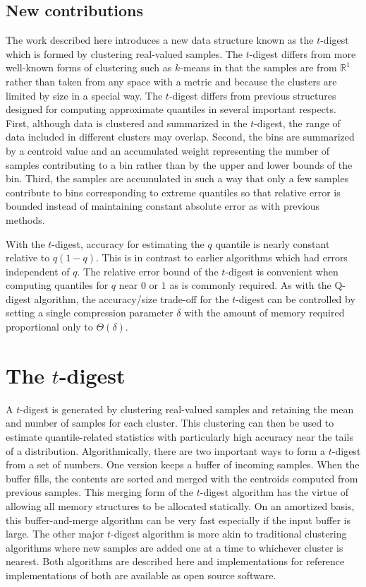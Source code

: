 \documentclass[]{statsoc}
\begin{document}
\subsection{New contributions}
The work described here introduces a new data structure known as the $t$-digest which is formed by clustering real-valued samples. The $t$-digest differs from more well-known forms of clustering such as $k$-means in that the samples are from $\mathbb R^1$ rather than taken from any space with a metric and because the clusters are limited by size in a special way. The $t$-digest differs from previous structures designed for computing approximate quantiles in several important respects. First, although data is clustered and summarized in the $t$-digest, the range of data included in different clusters may overlap. Second, the bins are summarized by a centroid value and an accumulated weight representing the number of samples contributing to a bin rather than by the upper and lower bounds of the bin. Third, the samples are accumulated in such a way that only a few samples contribute to bins corresponding to extreme quantiles so that relative error is bounded instead of maintaining constant absolute error as with previous methods.

With the $t$-digest, accuracy for estimating the $q$ quantile is nearly constant relative to $q(1-q)$.  This is in contrast to earlier algorithms which had errors independent of $q$.  The relative error bound of the $t$-digest is convenient when computing quantiles for $q$ near $0$ or $1$ as is commonly required.  As with the Q-digest algorithm, the accuracy/size trade-off for the $t$-digest can be controlled by setting a single compression parameter $\delta$ with the amount of memory required proportional only to $\Theta(\delta)$. 

\section{The $t$-digest}
A $t$-digest is generated by clustering real-valued samples and retaining the mean and number of samples for each cluster. This clustering can then be used to estimate quantile-related statistics with particularly high accuracy near the tails of a distribution. Algorithmically, there are two important ways to form a $t$-digest from a set of numbers. One version keeps a buffer of incoming samples. When the buffer fills, the contents are sorted and merged with the centroids computed from previous samples. This merging form of the $t$-digest algorithm has the virtue of allowing all memory structures to be allocated statically. On an amortized basis, this buffer-and-merge algorithm can be very fast especially if the input buffer is large. The other major $t$-digest algorithm is more akin to traditional clustering algorithms where new samples are added one at a time to whichever cluster is nearest.  Both algorithms are described here and implementations for reference implementations of both are available as open source software. 
\end{document}
